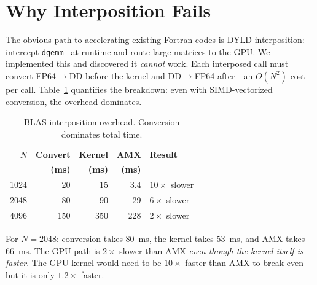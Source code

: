 \documentclass[conference]{IEEEtran}
\begin{document}
\section{Why Interposition Fails}
\label{sec:integration}
The obvious path to accelerating existing Fortran codes is DYLD interposition: intercept \texttt{dgemm\_} at runtime and route large matrices to the GPU. We implemented this and discovered it \emph{cannot} work.
Each interposed call must convert FP64$\to$DD before the kernel and DD$\to$FP64 after---an $O(N^2)$ cost per call. Table~\ref{tab:interpose} quantifies the breakdown: even with SIMD-vectorized conversion, the overhead dominates.
\begin{table}[t]
\centering
\caption{BLAS interposition overhead. Conversion dominates total time.}
\label{tab:interpose}
\begin{tabular}{r@{\hskip 6pt}r@{\hskip 6pt}r@{\hskip 6pt}r@{\hskip 6pt}l}
\toprule
$N$ & \textbf{Convert} & \textbf{Kernel} & \textbf{AMX} & \textbf{Result} \\
    & \textbf{(ms)} & \textbf{(ms)} & \textbf{(ms)} & \\
\midrule
1024 & 20 & 15 & 3.4  & $10{\times}$ slower \\
2048 & 80 & 90 & 29   & $6{\times}$ slower \\
4096 & 150 & 350 & 228 & $2{\times}$ slower \\
\bottomrule
\end{tabular}
\end{table}
For $N{=}2048$: conversion takes 80~ms, the kernel takes 53~ms, and AMX takes 66~ms. The GPU path is $2{\times}$ slower than AMX \emph{even though the kernel itself is faster}. The GPU kernel would need to be $10{\times}$ faster than AMX to break even---but it is only $1.2{\times}$ faster.
\end{document}
